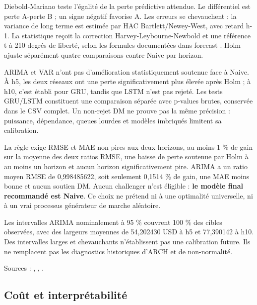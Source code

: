 Diebold-Mariano teste l’égalité de la perte prédictive attendue. Le différentiel est perte A-perte B ; un signe négatif favorise A. Les erreurs se chevauchent : la variance de long terme est estimée par HAC Bartlett/Newey-West, avec retard h-1. La statistique reçoit la correction Harvey-Leybourne-Newbold et une référence t à 210 degrés de liberté, selon les formules documentées dans forecast \cite{R15}. Holm ajuste séparément quatre comparaisons contre Naive par horizon.







ARIMA et VAR n’ont pas d’amélioration statistiquement soutenue face à Naive. À h5, les deux réseaux ont une perte significativement plus élevée après Holm ; à h10, c’est établi pour GRU, tandis que LSTM n’est pas rejeté. Les tests GRU/LSTM constituent une comparaison séparée avec p-values brutes, conservée dans le CSV complet. Un non-rejet DM ne prouve pas la même précision : puissance, dépendance, queues lourdes et modèles imbriqués limitent sa calibration.



La règle exige RMSE et MAE non pires aux deux horizons, au moins 1 \% de gain sur la moyenne des deux ratios RMSE, une baisse de perte soutenue par Holm à au moins un horizon et aucun horizon significativement pire. ARIMA a un ratio moyen RMSE de 0,998485622, soit seulement 0,1514 \% de gain, une MAE moins bonne et aucun soutien DM. Aucun challenger n’est éligible : \textbf{le modèle final recommandé est Naive}. Ce choix ne prétend ni à une optimalité universelle, ni à un vrai processus générateur de marche aléatoire.



Les intervalles ARIMA nominalement à 95 \% couvrent 100 \% des cibles observées, avec des largeurs moyennes de 54,202430 USD à h5 et 77,390142 à h10. Des intervalles larges et chevauchants n’établissent pas une calibration future. Ils ne remplacent pas les diagnostics historiques d’ARCH et de non-normalité.



Sources : , , .


\subsection{Coût et interprétabilité}



